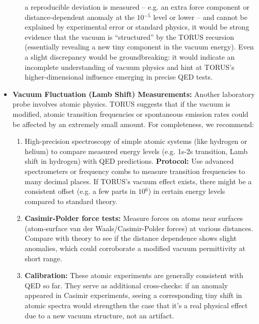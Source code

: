 \documentclass[]{article}
\newcommand{\superscript}[1]{\ensuremath{^{\mathrm{#1}}}}
\begin{document}
\begin{itemize}
\begin{enumerate}
    a reproducible deviation is measured -- e.g. an extra force
    component or distance-dependent anomaly at the $10\superscript{−5}$
    level or lower -- and cannot be explained by experimental error or
    standard physics, it would be strong evidence that the vacuum is
    ``structured'' by the TORUS recursion (essentially revealing a new
    tiny component in the vacuum energy)​. Even a slight discrepancy
    would be groundbreaking: it would indicate an incomplete
    understanding of vacuum physics and hint at TORUS's
    higher-dimensional influence emerging in precise QED tests.
  \end{enumerate}
\item
  \textbf{Vacuum Fluctuation (Lamb Shift) Measurements:} Another
  laboratory probe involves atomic physics. TORUS suggests that if the
  vacuum is modified, atomic transition frequencies or spontaneous
  emission rates could be affected by an extremely small amount​. For
  completeness, we recommend:

  \begin{enumerate}
  \def\labelenumi{\alph{enumi}.}
  \item
    High-precision spectroscopy of simple atomic systems (like hydrogen
    or helium) to compare measured energy levels (e.g. 1s-2s transition,
    Lamb shift in hydrogen) with QED predictions. \textbf{Protocol:} Use
    advanced spectrometers or frequency combs to measure transition
    frequencies to many decimal places. If TORUS's vacuum effect exists,
    there might be a consistent offset (e.g. a few parts in
    $10\superscript{6}$) in
    certain energy levels compared to standard theory​.
  \item
    \textbf{Casimir-Polder force tests:} Measure forces on atoms near
    surfaces (atom-surface van der Waals/Casimir-Polder forces) at
    various distances. Compare with theory to see if the distance
    dependence shows slight anomalies, which could corroborate a
    modified vacuum permittivity at short range.
  \item
    \textbf{Calibration:} These atomic experiments are generally
    consistent with QED so far. They serve as additional cross-checks:
    if an anomaly appeared in Casimir experiments, seeing a
    corresponding tiny shift in atomic spectra would strengthen the case
    that it's a real physical effect due to a new vacuum structure, not
    an artifact.
  \end{enumerate}
\end{itemize}
\end{document}
